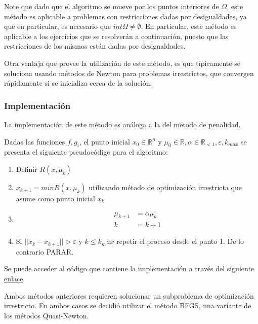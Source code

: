 \documentclass[titlepage, 11pt]{scrartcl}
\begin{document}
	Note que dado que el algoritmo se mueve por los puntos interiores de $\Omega$, este método es aplicable a problemas con restricciones dadas por desigualdades, ya que en particular, es necesario que $int \Omega \neq \emptyset$. En particular, este método es aplicable a los ejercicios que se resolverán a continuación, puesto que las restricciones de los mismos están dadas por desigualdades.
	
	Otra ventaja que provee la utilización de este método, es que típicamente se soluciona usando métodos de Newton para problemas irrestrictos, que convergen rápidamente si se inicializa cerca de la solución.
	
		\subsubsection{Implementación}
		La implementación de este método es análoga a la del método de penalidad.
		
	Dadas las funciones $f, g_i$, el punto inicial $x_0 \in \mathbb{R}^n$ y $\mu_0 \in \mathbb{R}, \alpha \in \mathbb{R}_{< 1}, \varepsilon, k_{max}$ se presenta el siguiente pseudocódigo para el algoritmo:
	\begin{enumerate}
		\item Definir $R(x, \mu_k)$
		\item $x_{k + 1} = min R(x, \mu_k)$ utilizando método de optimización irrestricta que asume como punto inicial $x_k$
		\item \begin{align*}
		\mu_{k + 1} &= \alpha \mu_k\\
		k &= k + 1
		\end{align*}
		\item Si $||x_k - x_{k+ 1}|| > \varepsilon$ y $k \leq k_max$ repetir el proceso desde el punto 1. De lo contrario PARAR.
	\end{enumerate}
	Se puede acceder al código que contiene la implementación a través del siguiente \href{methods.py}{enlace}.
	
	Ambos métodos anteriores requieren solucionar un subproblema de optimización irrestricto. En ambos casos se decidió utilizar el método BFGS, una variante de los métodos Quasi-Newton.
	
\end{document}
